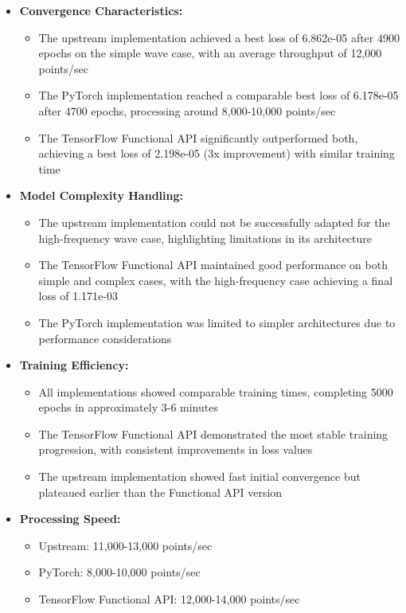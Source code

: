 \documentclass[10pt,journal,compsoc,onecolumn]{IEEEtran}
\begin{document}
\begin{itemize}
    \item \textbf{Convergence Characteristics:}
    \begin{itemize}
        \item The upstream implementation achieved a best loss of 6.862e-05 after 4900 epochs on the simple wave case, with an average throughput of 12,000 points/sec
        \item The PyTorch implementation reached a comparable best loss of 6.178e-05 after 4700 epochs, processing around 8,000-10,000 points/sec
        \item The TensorFlow Functional API significantly outperformed both, achieving a best loss of 2.198e-05 (3x improvement) with similar training time
    \end{itemize}
    
    \item \textbf{Model Complexity Handling:}
    \begin{itemize}
        \item The upstream implementation could not be successfully adapted for the high-frequency wave case, highlighting limitations in its architecture
        \item The TensorFlow Functional API maintained good performance on both simple and complex cases, with the high-frequency case achieving a final loss of 1.171e-03
        \item The PyTorch implementation was limited to simpler architectures due to performance considerations
    \end{itemize}
    
    \item \textbf{Training Efficiency:}
    \begin{itemize}
        \item All implementations showed comparable training times, completing 5000 epochs in approximately 3-6 minutes
        \item The TensorFlow Functional API demonstrated the most stable training progression, with consistent improvements in loss values
        \item The upstream implementation showed fast initial convergence but plateaued earlier than the Functional API version
    \end{itemize}
    
    \item \textbf{Processing Speed:}
    \begin{itemize}
        \item Upstream: 11,000-13,000 points/sec
        \item PyTorch: 8,000-10,000 points/sec
        \item TensorFlow Functional API: 12,000-14,000 points/sec
    \end{itemize}
\end{itemize}
\end{document}

